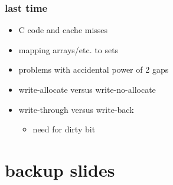 \date{}
\title{}
\date{}

\begin{frame}
    \titlepage
\end{frame}

\begin{frame}
\frametitle{last time}
\begin{itemize}
    \item C code and cache misses
    \item mapping arrays/etc. to sets
    \item problems with accidental power of 2 gaps
    \item write-allocate versus write-no-allocate
    \item write-through versus write-back
        \begin{itemize}
        \item need for dirty bit
        \end{itemize}
\end{itemize}
\end{frame}

\section{backup slides}
\begin{frame}
\end{frame}
\begin{frame}
\end{frame}
\begin{frame}
\end{frame}
\begin{frame}
\end{frame}
\begin{frame}
\end{frame}


